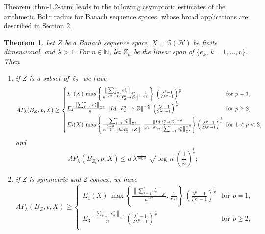 \documentclass[a4paper,11pt, reqno]{amsart}
\newtheorem{thm}{Theorem}[section]
\theoremstyle{definition}
\newcommand{\norm}[1]{\left\lVert#1\right\rVert}
\begin{document}
Theorem \ref{thm-1.2-atm} leads to the following asymptotic estimates of the arithmetic Bohr radius for Banach sequence spaces, whose broad applications are described in Section $2$.
\begin{thm} \label{thm-1.3-a}
	Let $Z$ be a Banach sequence space, $X=\mathcal{B}(\mathcal{H})$ be finite dimensional, and $\lambda>1$. For $n\in \mathbb{N}$, let $Z_{n}$ be the linear span of $\{e_{k}, \, k=1,\ldots,n\}$. Then
	\begin{enumerate}
		\item if $Z$ is a subset of $\ell_2$ we have \begin{equation*}
			AP_{\lambda}(B_{Z}, p,X) \geq	\begin{cases}
				E_{1}(X)\,  \max \left\{\frac{\norm{\sum_{k=1}^{n}e^{*}_{k}}_{Z^{*}}}{n^{3/2}\, \norm{Id: \ell^n_{2} \rightarrow Z}}, \, \frac{1}{e\,n}\right\}\, \left(\frac{\lambda^p -1}{2\lambda^p - 1}\right)^{\frac{1}{p}} & \text{for $p=1$}, \\[2mm]
				E_{3} \frac{\norm{\sum_{k=1}^{n}e^{*}_{k}}_{Z^{*}}}{n}\norm{Id:\ell^n _2 \rightarrow Z}^{-\frac{2}{p}}\, \left(\frac{\lambda^p -1}{2\lambda^p - 1}\right)^{\frac{1}{p}}\, & \text{for $p \geq 2$}, \\[2mm]
				
				E_{2}(X)\,  \max \left\{\frac{\norm{\sum_{k=1}^{n}e^{*}_{k}}_{Z^{*}}}{n^{\frac{3-\theta}{2}} \norm{Id: \ell^n_{2} \rightarrow Z}},  \frac{\norm{Id:\ell^n _2 \rightarrow Z}^{-\theta}}{e^{(1-\theta)}n \norm{\sum_{k=1}^{n}e^{*}_{k}}_{Z^{*}}^{-\theta}}\right\}\left(\frac{\lambda^p -1}{2\lambda^p - 1}\right)^{\frac{1}{p}} \hspace{-2mm} & \text{for $1<p< 2$}, 
			\end{cases}
		\end{equation*}
		and 
		$$AP_{\lambda}(B_{Z_{n}}, p,X) \leq d\,  \lambda^{\frac{1}{\log\,n}}\,\, \sqrt{\log \, n} \, \left(\frac{1}{n}\right)^{\frac{1}{p}};$$
		\item if $Z$ is symmetric and $2$-convex, we have
		\begin{equation*}
			AP_{\lambda}(B_{Z}, p,X) \geq	\begin{cases}
				E_{1}(X)\,  \max \left\{\frac{\norm{\sum_{k=1}^{n}e^{*}_{k}}_{Z^{*}}}{n^{3/2}}, \, \frac{1}{e\,n}\right\}\, \left(\frac{\lambda^p -1}{2\lambda^p - 1}\right)^{\frac{1}{p}} & \text{for $p=1$}, \\[2mm]
				E_{3} \frac{\norm{\sum_{k=1}^{n}e^{*}_{k}}_{Z^{*}}}{n}\, \left(\frac{\lambda^p -1}{2\lambda^p - 1}\right)^{\frac{1}{p}}\, & \text{for $p \geq 2$}, \\[2mm]
				

\end{cases}
\end{equation*}
\end{enumerate}
\end{thm}
\end{document}
